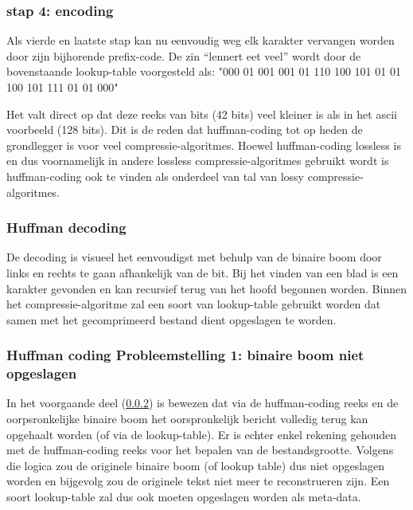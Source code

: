 \subsubsection{stap 4: encoding}
\label{sec:primitieve-technieken-voorbeeld-huffman-encoding-4}
Als vierde en laatste stap kan nu eenvoudig weg elk karakter vervangen worden door zijn bijhorende \gls{prefix-code}. De zin “lennert eet veel” wordt door de bovenstaande \gls{lookup-table} voorgesteld als:
"000 01 001 001 01 110 100 101 01 01 100 101 111 01 01 000"

Het valt direct op dat deze reeks van \glspl{bit} (42 \glspl{bit}) veel kleiner is als in het \gls{ascii} voorbeeld (128 \glspl{bit}). Dit is de reden dat \gls{huffman-coding} tot op heden de grondlegger is voor veel \glspl{compressie-algoritme}. Hoewel \gls{huffman-coding} \gls{lossless} is en dus voornamelijk in andere \gls{lossless} \glspl{compressie-algoritme} gebruikt wordt is \gls{huffman-coding} ook te vinden als onderdeel van tal van \gls{lossy} \glspl{compressie-algoritme}.


\subsubsection{Huffman decoding}
\label{sec:primitieve-technieken-voorbeeld-huffman-decoding}
De \gls{decoding} is visueel het eenvoudigst met behulp van de binaire boom door links en rechts te gaan afhankelijk van de bit. Bij het vinden van een blad is een karakter gevonden en kan recursief terug van het hoofd begonnen worden. Binnen het \gls{compressie-algoritme} zal een soort van \gls{lookup-table} gebruikt worden dat samen met het gecomprimeerd bestand dient opgeslagen te worden.

\subsubsection{Huffman coding Probleemstelling 1: binaire boom niet opgeslagen}
\label{sec:primitieve-technieken-voorbeeld-huffman-probleem-1}
In het voorgaande deel (\ref{sec:primitieve-technieken-voorbeeld-huffman-decoding}) is bewezen dat via de \gls{huffman-coding} reeks en de oorpsronkelijke binaire boom het oorspronkelijk bericht volledig terug kan opgehaalt worden (of via de \gls{lookup-table}). Er is echter enkel rekening gehouden met de \gls{huffman-coding} reeks voor het bepalen van de bestandsgrootte. Volgens die logica zou de originele binaire boom (of lookup table) dus niet opgeslagen worden en bijgevolg zou de originele tekst niet meer te reconstrueren zijn. Een soort \gls{lookup-table} zal dus ook moeten opgeslagen worden als \gls{meta-data}.


